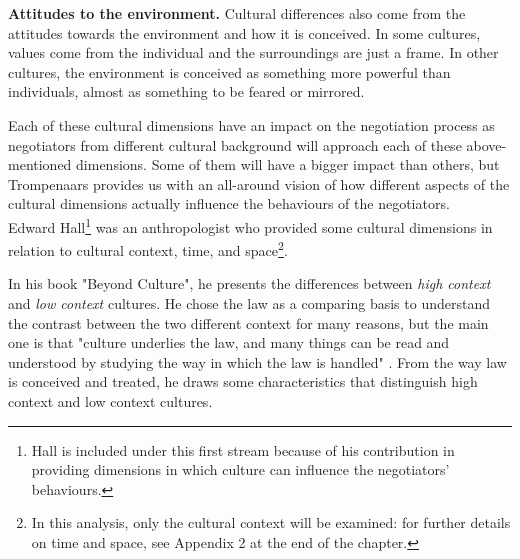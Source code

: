 \documentclass[../main.tex]{subfiles}
\begin{document}
\textbf{Attitudes to the environment.} Cultural differences also come from the attitudes towards the environment and how it is conceived. In some cultures, values come from the individual and the surroundings are just a frame. In other cultures, the environment is conceived as something more powerful than individuals, almost as something to be feared or mirrored.

Each of these cultural dimensions have an impact on the negotiation process as negotiators from different cultural background will approach each of these above-mentioned dimensions. Some of them will have a bigger impact than others, but Trompenaars provides us with an all-around vision of how different aspects of the cultural dimensions actually influence the behaviours of the negotiators.\\

Edward Hall\footnote{Hall is included under this first stream because of his contribution in providing dimensions in which culture can influence the negotiators' behaviours.} was an anthropologist who provided some cultural dimensions in relation to cultural context, time, and space\footnote{In this analysis, only the cultural context will be examined: for further details on time and space, see Appendix 2 at the end of the chapter.}. 

In his book "Beyond Culture", he presents the differences between \textit{high context} and \textit{low context} cultures. He chose the law as a comparing basis to understand the contrast between the two different context for many reasons, but the main one is that "culture underlies the law, and many things can be read and understood by studying the way in which the law is handled" \autocite[107]{hall1}. From the way law is conceived and treated, he draws some characteristics that distinguish high context and low context cultures.
\end{document}
